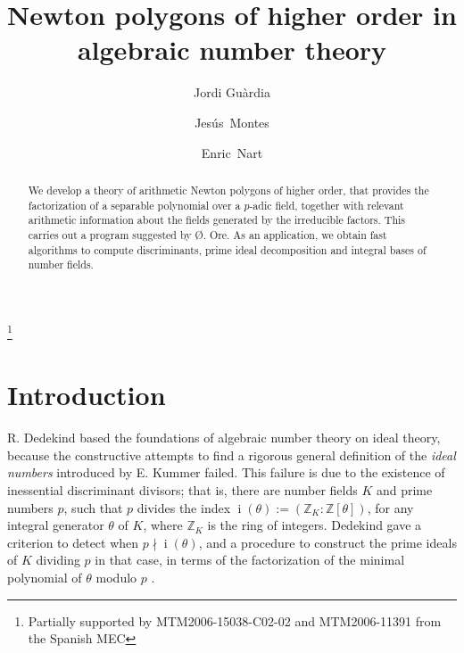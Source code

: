 \documentclass{amsart}
\newcommand{\Z}{\mathbb Z}
\def\indx{\operatorname{i}}
\def\t{\theta}
\begin{document}
\title{Newton polygons of higher order in algebraic number theory}
\author[Gu\`ardia]{Jordi Gu\`ardia}
\address{Departament de Matem\`atica Aplicada IV, Escola Polit\`ecnica Superior d'Enginyera de Vilanova i la Geltr\'u, Av. V\'\i ctor Balaguer s/n. E-08800 Vilanova i la Geltr\'u, Catalonia}

\author[Montes]{\hbox{Jes\'us Montes}}
\address{Departament de Ci\`encies Econ\`omiques i Socials,
Facultat de Ci\`encies Socials,
Universitat Abat Oliba CEU,
Bellesguard 30, E-08022 Barcelona, Catalonia, Spain}

\author[Nart]{\hbox{Enric Nart}}
\address{Departament de Matem{\`a}tiques,
         Universitat Aut{\`o}noma de Barcelona,
         Edifici C, E-08193 Bellaterra, Barcelona, Catalonia}
\thanks{Partially supported by MTM2006-15038-C02-02 and MTM2006-11391 from the Spanish MEC}
\date{}


\maketitle
\begin{abstract}
We develop a theory of arithmetic Newton polygons of higher order, that provides the factorization of a separable polynomial over a $p$-adic field, together with relevant arithmetic information about the fields generated by the irreducible factors. This carries out a program suggested by \O{}. Ore. As an application, we obtain fast algorithms to compute discriminants, prime ideal decomposition and integral bases of number fields.
\end{abstract}

\section*{Introduction}
R. Dedekind based the foundations of algebraic number theory on ideal theory, because the constructive attempts to find a rigorous general definition of the \emph{ideal numbers} introduced by E. Kummer failed. This failure is due to the existence of inessential discriminant divisors; that is, there are number fields $K$ and prime numbers $p$, such that $p$ divides the index $\indx(\t):=\left(\Z_K\colon \Z[\t]\right)$, for any integral generator $\t$ of $K$, where $\Z_K$ is the ring of integers.  Dedekind gave a criterion to detect when $p\nmid\indx(\t)$, and a procedure to construct the prime ideals of $K$ dividing $p$ in that case, in terms of the factorization of the minimal polynomial of $\t$ modulo $p$ \cite{de}. 
\end{document}
